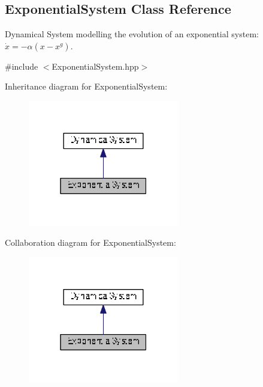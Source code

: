 \hypertarget{classDmpBbo_1_1ExponentialSystem}{\subsection{Exponential\+System Class Reference}
\label{classDmpBbo_1_1ExponentialSystem}
}


Dynamical System modelling the evolution of an exponential system\+: $\dot{x} = -\alpha (x-x^g)$.  




{\ttfamily \#include $<$Exponential\+System.\+hpp$>$}



Inheritance diagram for Exponential\+System\+:
\nopagebreak
\begin{figure}[H]
\begin{center}
\leavevmode
\includegraphics[width=187pt]{classDmpBbo_1_1ExponentialSystem__inherit__graph}
\end{center}
\end{figure}


Collaboration diagram for Exponential\+System\+:
\nopagebreak
\begin{figure}[H]
\begin{center}
\leavevmode
\includegraphics[width=187pt]{classDmpBbo_1_1ExponentialSystem__coll__graph}
\end{center}
\end{figure}
